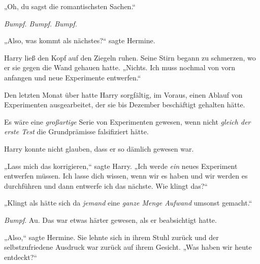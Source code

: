 „Oh, du sagst die romantischsten Sachen.“

\emph{Bumpf. Bumpf. Bumpf.}

„Also, was kommt als nächstes?“ sagte Hermine.

Harry ließ den Kopf auf den Ziegeln ruhen. Seine Stirn begann zu schmerzen, wo er sie gegen die Wand gehauen hatte. „Nichts. Ich muss nochmal von vorn anfangen und neue Experimente entwerfen.“

Den letzten Monat über hatte Harry sorgfältig, im Voraus, einen Ablauf von Experimenten ausgearbeitet, der sie bis Dezember beschäftigt gehalten hätte.

Es wäre eine \emph{großartige} Serie von Experimenten gewesen, wenn nicht \emph{gleich der erste Test} die Grundprämisse falsifiziert hätte.

Harry konnte nicht glauben, dass er so dämlich gewesen war.

„Lass mich das korrigieren,“ sagte Harry. „Ich werde \emph{ein} neues Experiment entwerfen müssen. Ich lasse dich wissen, wenn wir es haben und wir werden es durchführen und dann entwerfe ich das nächste. Wie klingt das?“

„Klingt als hätte sich da \emph{jemand} eine \emph{ganze Menge Aufwand} umsonst gemacht.“

\emph{Bumpf}. Au. Das war etwas härter gewesen, als er beabsichtigt hatte.

„Also,“ sagte Hermine. Sie lehnte sich in ihrem Stuhl zurück und der selbstzufriedene Ausdruck war zurück auf ihrem Gesicht. „Was haben wir heute entdeckt?“

